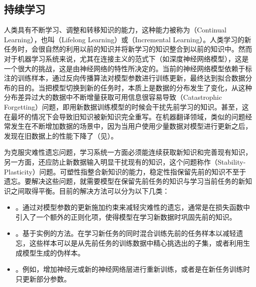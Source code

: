 
\subsection{持续学习}

\parinterval 人类具有不断学习、调整和转移知识的能力，这种能力被称为{\small{}}（Continual Learning），也叫{\small{}}（Lifelong Learning）或{\small{}}（Incremental Learning）。人类学习的新任务时，会很自然的利用以前的知识并将新学习的知识整合到以前的知识中。然而对于机器学习系统来说，尤其在连接主义的范式下（如深度神经网络模型），这是一个很大的挑战，这是由神经网络的特性所决定的。当前的神经网络模型依赖于标注的训练样本，通过反向传播算法对模型参数进行训练更新，最终达到拟合数据分布的目的。当把模型切换到新的任务时，本质上是数据的分布发生了变化，从这种分布差异过大的数据中不断增量获取可用信息很容易导致{\small{}}（Catastrophic Forgetting）问题，即用新数据训练模型的时候会干扰先前学习的知识。甚至，这在最坏的情况下会导致旧知识被新知识完全重写。在机器翻译领域，类似的问题经常发生在不断增加数据的场景中，因为当用户使用少量数据对模型进行更新之后，发现在旧数据上的性能下降了（见{\chaptereighteen}）。

\parinterval 为克服灾难性遗忘问题，学习系统一方面必须能连续获取新知识和完善现有知识，另一方面，还应防止新数据输入明显干扰现有的知识，这个问题称作{\small{}}（Stability-Plasticity）问题。可塑性指整合新知识的能力，稳定性指保留先前的知识不至于遗忘。要解决这些问题，就需要模型在保留先前任务的知识与学习当前任务的新知识之间取得平衡。目前的解决方法可以分为以下几类：

\begin{itemize}
\vspace{0.5em}
\item {\small{}}。通过对模型参数的更新施加约束来减轻灾难性的遗忘，通常是在损失函数中引入了一个额外的正则化项，使得模型在学习新数据时巩固先前的知识。
\vspace{0.5em}
\item {\small{}}。基于实例的方法。在学习新任务的同时混合训练先前的任务样本以减轻遗忘，这些样本可以是从先前任务的训练数据中精心挑选出的子集，或者利用生成模型生成的伪样本。
\vspace{0.5em}
\item {\small{}}。例如，增加神经元或新的神经网络层进行重新训练，或者是在新任务训练时只更新部分参数。
\vspace{0.5em}
\end{itemize}

